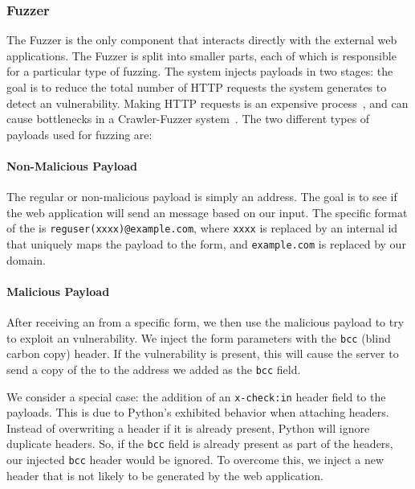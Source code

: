 \subsubsection{Fuzzer}
\label{Comp:Fuzzer}
The Fuzzer is the only component that interacts directly with the external web applications. The Fuzzer is split into smaller parts, each of which is responsible for a particular type of fuzzing.  The system injects payloads in two stages: the goal is to reduce the total number of HTTP requests the system generates to detect an \ehi vulnerability. Making HTTP requests is an expensive process~\cite{McGrath2009}, and can cause bottlenecks in a Crawler-Fuzzer system~\cite{ShkapenyukTorstenSuel2001}.
The two different types of payloads used for fuzzing are:
\paragraph{Non-Malicious Payload}
\label{Comp:Fuzzer:nmp}
The regular or non-malicious payload is simply an \email address. The goal is to see if the web application will send an \email message based on our input. The specific format of the \email is \texttt{reguser(xxxx)@example.com}, where \texttt{xxxx} is replaced by an internal id that uniquely maps the payload to the form, and \texttt{example.com} is replaced by our domain.

\paragraph{Malicious Payload}
\label{Comp:Fuzzer:mp}
After receiving an \email from a specific form, we then use the malicious payload to try to exploit an \ehi vulnerability. We inject the form parameters with the \texttt{bcc} (blind carbon copy) header. If the vulnerability is present, this will cause the server to send a copy of the \email to the \email address we added as the \texttt{bcc} field.

We consider a special case: the addition of an \texttt{x-check:in} header field to the payloads. This is due to Python's exhibited behavior when attaching
headers. Instead of overwriting a header if it is already present, Python will ignore duplicate headers. So, if the \texttt{bcc} field is already present as part of the headers, our injected \texttt{bcc} header would be ignored. To overcome this, we inject a new header that is not likely to be generated by the web application. 

